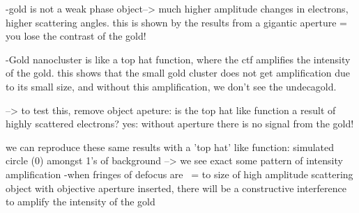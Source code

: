 -gold is not a weak phase object--> much higher amplitude changes in electrons, higher scattering angles. this is shown by the results from a gigantic aperture = you lose the contrast of the gold!

-Gold nanocluster is like a top hat function, where the ctf amplifies the intensity of the gold. this shows that the small gold cluster does not get amplification due to its small size, and without this amplification, we don't see the undecagold.

--> to test this, remove object apeture: is the top hat like function a result of highly scattered electrons? yes: without aperture there is no signal from the gold!

we can reproduce these same results with a 'top hat' like function: simulated circle (0) amongst 1's of background
--> we see exact some pattern of intensity amplification
-when fringes of defocus are ~= to size of high amplitude scattering object with objective aperture inserted, there will be a constructive interference to amplify the intensity of the gold

\indent 

